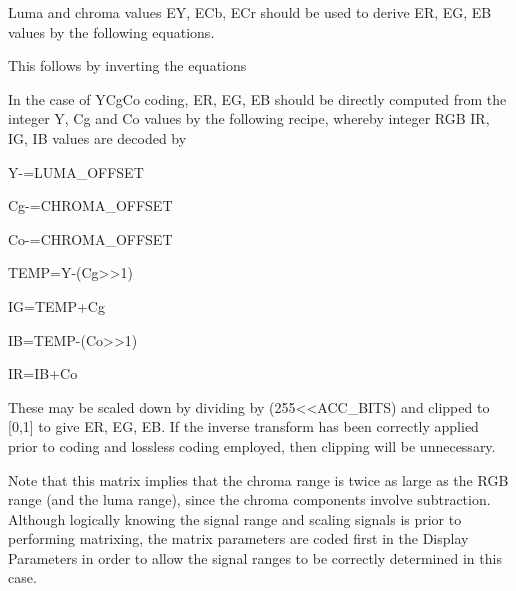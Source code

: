 \label{colourmatrix}
Luma and chroma values EY, ECb, ECr should be used to derive ER, EG, EB
values by the following equations.



This follows by inverting the equations 



In the case of YCgCo coding, ER, EG, EB should be directly computed from
the integer Y, Cg and Co values by the following recipe, whereby integer
RGB IR, IG, IB values are decoded by

Y-=LUMA\_OFFSET

Cg-=CHROMA\_OFFSET

Co-=CHROMA\_OFFSET

TEMP=Y-(Cg>>1)

IG=TEMP+Cg

IB=TEMP-(Co>>1)

IR=IB+Co

These may be scaled down by dividing by (255<<ACC\_BITS) and clipped to
[0,1] to give ER, EG, EB. If the inverse transform has been correctly
applied prior to coding and lossless coding employed, then clipping will
be unnecessary.

Note that this matrix implies that the chroma range is twice as large as
the RGB range (and the luma range), since the chroma components involve
subtraction. Although logically knowing the signal range and scaling
signals is prior to performing matrixing, the matrix parameters are
coded first in the Display Parameters in order to allow the signal
ranges to be correctly determined in this case.


